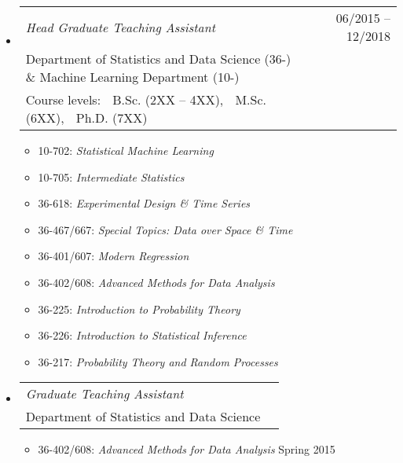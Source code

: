 \documentclass[letterpaper,10pt]{extarticle}
\makeatletter
\newcommand{\subheadingtwolines}[4]{
\begin{tabular*}{6.55in}{l@{\cftdotfill{\cftsecdotsep}\extracolsep{\fill}}r}
#1 & #2 \\
#3 & #4 \\
\end{tabular*}}
\newcommand{\subheadingthreelines}[6]{
\begin{tabular*}{6.55in}{l@{\cftdotfill{\cftsecdotsep}\extracolsep{\fill}}r}
#1 & #2 \\
#3 & #4 \\
#5 & #6 \\
\end{tabular*}}
\makeatother
\begin{document}
\begin{itemize}[leftmargin=0.4cm]
\vspace{0.075cm}

\item[] \hspace{-2ex}\subheadingthreelines{\it Head Graduate Teaching Assistant}{06/2015 -- 12/2018}{Department of Statistics and Data Science (36-) \& Machine Learning Department (10-)}{}{Course levels: $\;$ B.Sc. (2XX -- 4XX), $\;$ M.Sc. (6XX), $\;$ Ph.D. (7XX)}{}
\begin{itemize}[leftmargin=0.4cm, rightmargin=0cm]
\item 10-702: \hspace{5.9ex}\emph{Statistical Machine Learning}
\item 10-705: \hspace{4.95ex} \emph{Intermediate Statistics}
\item 36-618: \hspace{5.95ex}\emph{Experimental Design \& Time Series} 
\item 36-467/667:\hspace{1.27ex}  \emph{Special Topics: Data over Space \& Time} 
\item 36-401/607: \hspace{1.27ex}\emph{Modern Regression}
\item 36-402/608: \hspace{1.27ex}\emph{Advanced Methods for Data Analysis} 
\item 36-225: \hspace{6ex}\emph{Introduction to Probability Theory}
\item 36-226: \hspace{6ex}\emph{Introduction to Statistical Inference}
\item 36-217: \hspace{5.9ex}\emph{Probability Theory and Random Processes}
\end{itemize}

\vspace{0.075cm}

\item[] \hspace{-2.3ex}\subheadingtwolines{{\it Graduate Teaching Assistant}}{}{Department of Statistics and Data Science}{}
\begin{itemize}[leftmargin=0.4cm, rightmargin=0cm]
\item 36-402/608: \hspace{1.28ex}\emph{Advanced Methods for Data Analysis} \hfill Spring 2015
\end{itemize}

\end{itemize}
\end{document}
